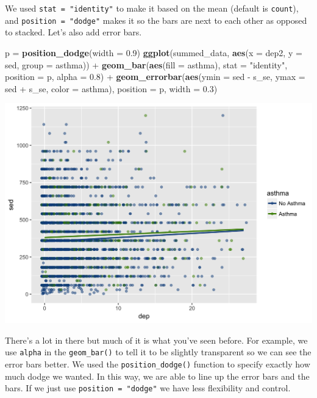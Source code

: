 \documentclass[]{tufte-book}
\newenvironment{Shaded}{}{}
\newcommand{\KeywordTok}[1]{\textcolor[rgb]{0.00,0.44,0.13}{\textbf{#1}}}
\newcommand{\DataTypeTok}[1]{\textcolor[rgb]{0.56,0.13,0.00}{#1}}
\newcommand{\FloatTok}[1]{\textcolor[rgb]{0.25,0.63,0.44}{#1}}
\newcommand{\StringTok}[1]{\textcolor[rgb]{0.25,0.44,0.63}{#1}}
\newcommand{\OperatorTok}[1]{\textcolor[rgb]{0.40,0.40,0.40}{#1}}
\newcommand{\NormalTok}[1]{#1}
\theoremstyle{definition}
\theoremstyle{definition}
\theoremstyle{remark}
\begin{document}
We used \texttt{stat\ =\ "identity"} to make it based on the mean
(default is \texttt{count}), and \texttt{position\ =\ "dodge"} makes it
so the bars are next to each other as opposed to stacked. Let's also add
error bars.

\begin{Shaded}
\begin{Highlighting}[]
\NormalTok{p =}\StringTok{ }\KeywordTok{position_dodge}\NormalTok{(}\DataTypeTok{width =} \FloatTok{0.9}\NormalTok{)}
\KeywordTok{ggplot}\NormalTok{(summed_data, }\KeywordTok{aes}\NormalTok{(}\DataTypeTok{x =}\NormalTok{ dep2, }\DataTypeTok{y =}\NormalTok{ sed, }\DataTypeTok{group =}\NormalTok{ asthma)) }\OperatorTok{+}\StringTok{ }
\StringTok{    }\KeywordTok{geom_bar}\NormalTok{(}\KeywordTok{aes}\NormalTok{(}\DataTypeTok{fill =}\NormalTok{ asthma), }\DataTypeTok{stat =} \StringTok{"identity"}\NormalTok{, }
        \DataTypeTok{position =}\NormalTok{ p, }\DataTypeTok{alpha =} \FloatTok{0.8}\NormalTok{) }\OperatorTok{+}\StringTok{ }\KeywordTok{geom_errorbar}\NormalTok{(}\KeywordTok{aes}\NormalTok{(}\DataTypeTok{ymin =}\NormalTok{ sed }\OperatorTok{-}\StringTok{ }
\StringTok{    }\NormalTok{s_se, }\DataTypeTok{ymax =}\NormalTok{ sed }\OperatorTok{+}\StringTok{ }\NormalTok{s_se, }\DataTypeTok{color =}\NormalTok{ asthma), }
    \DataTypeTok{position =}\NormalTok{ p, }\DataTypeTok{width =} \FloatTok{0.3}\NormalTok{)}
\end{Highlighting}
\end{Shaded}

\includegraphics{_main_files/figure-latex/unnamed-chunk-144-1}

There's a lot in there but much of it is what you've seen before. For
example, we use \texttt{alpha} in the \texttt{geom\_bar()} to tell it to
be slightly transparent so we can see the error bars better. We used the
\texttt{position\_dodge()} function to specify exactly how much dodge we
wanted. In this way, we are able to line up the error bars and the bars.
If we just use \texttt{position\ =\ "dodge"} we have less flexibility
and control.
\end{document}
